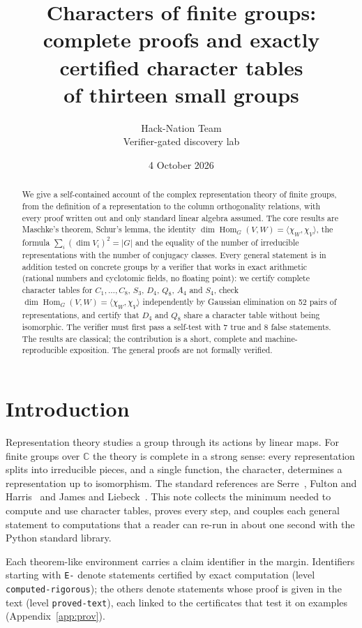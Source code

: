 \documentclass[11pt]{article}
\title{Characters of finite groups:\\ complete proofs and exactly certified character tables\\ of thirteen small groups}
\author{Hack-Nation Team\\ \small Verifier-gated discovery lab}
\date{4 October 2026}
\theoremstyle{definition}
\theoremstyle{remark}
\newcommand{\C}{\mathbb{C}}
\newcommand{\Hom}{\operatorname{Hom}}
\newcommand{\ip}[2]{\langle #1, #2\rangle}
\begin{document}
\maketitle

\begin{abstract}
We give a self-contained account of the complex representation theory of finite groups, from the definition of a
representation to the column orthogonality relations, with every proof written out and only standard linear algebra
assumed. The core results are Maschke's theorem, Schur's lemma, the identity $\dim\Hom_G(V,W)=\ip{\chi_W}{\chi_V}$, the
formula $\sum_i(\dim V_i)^2=|G|$ and the equality of the number of irreducible representations with the number of
conjugacy classes. Every general statement is in addition tested on concrete groups by a verifier that works in exact
arithmetic (rational numbers and cyclotomic fields, no floating point): we certify complete character tables for
$C_1,\dots,C_8$, $S_3$, $D_4$, $Q_8$, $A_4$ and $S_4$, check $\dim\Hom_G(V,W)=\ip{\chi_W}{\chi_V}$ independently by
Gaussian elimination on 52 pairs of representations, and certify that $D_4$ and $Q_8$ share a character table without being
isomorphic. The verifier must first pass a self-test with 7 true and 8 false statements. The results are classical; the
contribution is a short, complete and machine-reproducible exposition. The general proofs are not formally verified.
\end{abstract}

\section{Introduction}
Representation theory studies a group through its actions by linear maps. For finite groups over $\C$ the theory is
complete in a strong sense: every representation splits into irreducible pieces, and a single function, the character,
determines a representation up to isomorphism. The standard references are Serre~\cite{Serre}, Fulton and
Harris~\cite{FH} and James and Liebeck~\cite{JL}. This note collects the minimum needed to compute and use character
tables, proves every step, and couples each general statement to computations that a reader can re-run in about one
second with the Python standard library.

Each theorem-like environment carries a claim identifier in the margin. Identifiers starting with \texttt{E-} denote
statements certified by exact computation (level \texttt{computed-rigorous}); the others denote statements whose proof is
given in the text (level \texttt{proved-text}), each linked to the certificates that test it on examples
(Appendix~\ref{app:prov}).
\end{document}
